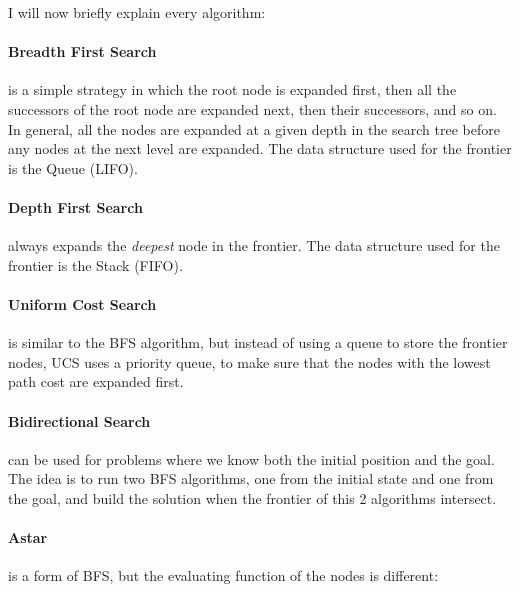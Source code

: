 \documentclass[a4paper,12pt]{report}
\begin{document}
I will now briefly explain every algorithm:

\paragraph{Breadth First Search} is a simple strategy in which the root node is expanded first, then all the successors of the root node are expanded next, then their successors, and so on. In general, all the nodes are expanded at a given depth in the search tree before any nodes at the next level are expanded. The data structure used for the frontier is the Queue (LIFO). \cite{russell2016artificial}

\paragraph{Depth First Search} always expands the \textit{deepest} node in the frontier. The data structure used for the frontier is the Stack (FIFO). \cite{russell2016artificial}

\paragraph{Uniform Cost Search} is similar to the BFS algorithm, but instead of using a queue to store the frontier nodes, UCS uses a priority queue, to make sure that the nodes with the lowest path cost are expanded first.

\paragraph{Bidirectional Search} can be used for problems where we know both the initial position and the goal. The idea is to run two BFS algorithms, one from the initial state and one from the goal, and build the solution when the frontier of this 2 algorithms intersect. \cite{russell2016artificial}

\paragraph{Astar} is a form of BFS, but the evaluating function of the nodes is different:

\vspace{0.3cm}
\vspace{0.3cm}
\end{document}
